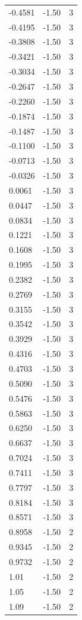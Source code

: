 \begin{longtable}{lrr}
  -0.4581 & -1.50 & 3 \\
  -0.4195 & -1.50 & 3 \\
  -0.3808 & -1.50 & 3 \\
  -0.3421 & -1.50 & 3 \\
  -0.3034 & -1.50 & 3 \\
  -0.2647 & -1.50 & 3 \\
  -0.2260 & -1.50 & 3 \\
  -0.1874 & -1.50 & 3 \\
  -0.1487 & -1.50 & 3 \\
  -0.1100 & -1.50 & 3 \\
  -0.0713 & -1.50 & 3 \\
  -0.0326 & -1.50 & 3 \\
  0.0061 & -1.50 & 3 \\
  0.0447 & -1.50 & 3 \\
  0.0834 & -1.50 & 3 \\
  0.1221 & -1.50 & 3 \\
  0.1608 & -1.50 & 3 \\
  0.1995 & -1.50 & 3 \\
  0.2382 & -1.50 & 3 \\
  0.2769 & -1.50 & 3 \\
  0.3155 & -1.50 & 3 \\
  0.3542 & -1.50 & 3 \\
  0.3929 & -1.50 & 3 \\
  0.4316 & -1.50 & 3 \\
  0.4703 & -1.50 & 3 \\
  0.5090 & -1.50 & 3 \\
  0.5476 & -1.50 & 3 \\
  0.5863 & -1.50 & 3 \\
  0.6250 & -1.50 & 3 \\
  0.6637 & -1.50 & 3 \\
  0.7024 & -1.50 & 3 \\
  0.7411 & -1.50 & 3 \\
  0.7797 & -1.50 & 3 \\
  0.8184 & -1.50 & 3 \\
  0.8571 & -1.50 & 3 \\
  0.8958 & -1.50 & 2 \\
  0.9345 & -1.50 & 2 \\
  0.9732 & -1.50 & 2 \\
  1.01 & -1.50 & 2 \\
  1.05 & -1.50 & 2 \\
  1.09 & -1.50 & 2 \\

\end{longtable}
